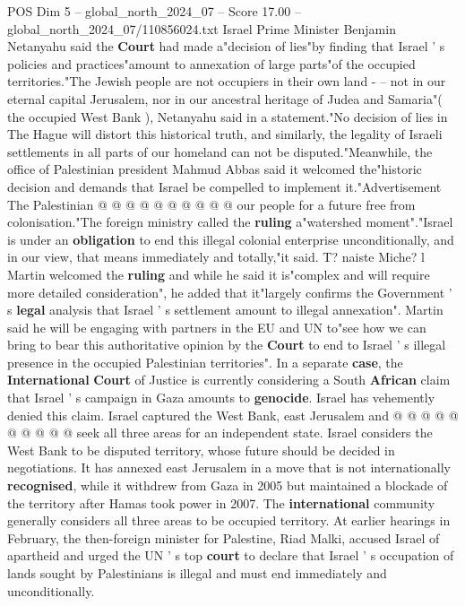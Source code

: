 \begin{textsample}{POS Dim 5 – global\_north\_2024\_07 – Score 17.00 – global\_north\_2024\_07/110856024.txt}
Israel Prime Minister Benjamin Netanyahu said the \textbf{Court} had made a"decision of lies"by finding that Israel ' s policies and practices"amount to annexation of large parts"of the occupied territories."The Jewish people are not occupiers in their own land - -- not in our eternal capital Jerusalem, nor in our ancestral heritage of Judea and Samaria"( the occupied West Bank ), Netanyahu said in a statement."No decision of lies in The Hague will distort this historical truth, and similarly, the legality of Israeli settlements in all parts of our homeland can not be disputed."Meanwhile, the office of Palestinian president Mahmud Abbas said it welcomed the"historic decision and demands that Israel be compelled to implement it."Advertisement The Palestinian @ @ @ @ @ @ @ @ @ @ our people for a future free from colonisation."The foreign ministry called the \textbf{ruling} a"watershed moment"."Israel is under an \textbf{obligation} to end this illegal colonial enterprise unconditionally, and in our view, that means immediately and totally,"it said.
T? naiste Miche? l Martin welcomed the \textbf{ruling} and while he said it is"complex and will require more detailed consideration", he added that it"largely confirms the Government ' s \textbf{legal} analysis that Israel ' s settlement amount to illegal annexation".
Martin said he will be engaging with partners in the EU and UN to"see how we can bring to bear this authoritative opinion by the \textbf{Court} to end to Israel ' s illegal presence in the occupied Palestinian territories".
In a separate \textbf{case}, the \textbf{International} \textbf{Court} of Justice is currently considering a South \textbf{African} claim that Israel ' s campaign in Gaza amounts to \textbf{genocide}.
Israel has vehemently denied this claim.
Israel captured the West Bank, east Jerusalem and @ @ @ @ @ @ @ @ @ @ seek all three areas for an independent state.
Israel considers the West Bank to be disputed territory, whose future should be decided in negotiations.
It has annexed east Jerusalem in a move that is not internationally \textbf{recognised}, while it withdrew from Gaza in 2005 but maintained a blockade of the territory after Hamas took power in 2007.
The \textbf{international} community generally considers all three areas to be occupied territory.
At earlier hearings in February, the then-foreign minister for Palestine, Riad Malki, accused Israel of apartheid and urged the UN ' s top \textbf{court} to declare that Israel ' s occupation of lands sought by Palestinians is illegal and must end immediately and unconditionally.

\end{textsample}
